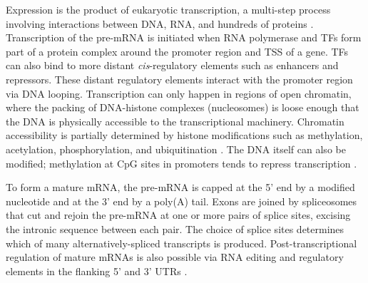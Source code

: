 Expression is the product of eukaryotic transcription, a multi-step process involving interactions between DNA, RNA, and hundreds of proteins \autocite{cramer2019OrganizationRegulationGene}.
Transcription of the pre-\gls{mRNA} is initiated when RNA polymerase and \glspl{TF} form part of a protein complex around the promoter region and \gls{TSS} of a gene.
\Glspl{TF} can also bind to more distant \textit{cis}-regulatory elements such as enhancers and repressors.
These distant regulatory elements interact with the promoter region via DNA looping.
Transcription can only happen in regions of open chromatin, where the packing of DNA-histone complexes (nucleosomes) is loose enough that the DNA is physically accessible to the transcriptional machinery.
Chromatin accessibility is partially determined by histone modifications such as methylation, acetylation, phosphorylation, and ubiquitination \autocite{bannister2011RegulationChromatinHistone}.
The DNA itself can also be modified; methylation at CpG sites in promoters tends to repress transcription \autocite{robertson2000DNAMethylationHealth}.

To form a mature \gls{mRNA}, the pre-\gls{mRNA} is capped at the 5' end by a modified nucleotide and at the 3' end by a poly(A) tail.
Exons are joined by spliceosomes that cut and rejoin the pre-\gls{mRNA} at one or more pairs of splice sites, excising the intronic sequence between each pair.
The choice of splice sites determines which of many alternatively-spliced transcripts is produced.
Post-transcriptional regulation of mature \glspl{mRNA} is also possible via RNA editing \autocite{gott2000FunctionsMechanismsRNA} and regulatory elements in the flanking 5' and 3' \glspl{UTR} \autocite{mignone2002UntranslatedRegionsMRNAs}.

